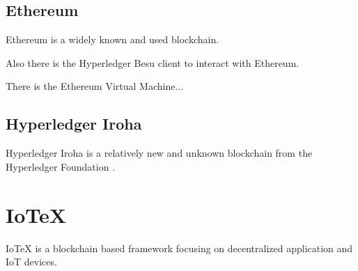\subsection{Ethereum} %
\label{sec:Ethereum}

Ethereum is a widely known and used blockchain.

Also there is the Hyperledger Besu \cite{hyperledger:wiki} client to interact with Ethereum.

There is the Ethereum Virtual Machine...

\subsection{Hyperledger Iroha} %
\label{sub:Hyperledger Iroha}

Hyperledger Iroha is a relatively new and unknown blockchain from the Hyperledger Foundation \cite{hyperledger:wiki}.

\section{IoTeX} %
\label{sec:IoTeX}
IoTeX is a blockchain based  framework focusing on decentralized application and IoT devices.

